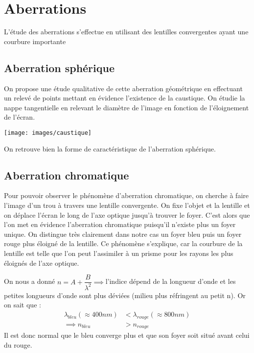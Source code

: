\documentclass[12pt,a4paper]{article}
\begin{document}
	\section{Aberrations}
	L'étude des aberrations s'effectue en utilisant des lentilles convergentes ayant une courbure importante
	\subsection{Aberration sphérique}
	On propose une étude qualitative de cette aberration géométrique en effectuant un relevé de points mettant en évidence l'existence de la caustique. On étudie la nappe tangentielle en relevant le diamètre de l'image en fonction de l'éloignement de l'écran.
	\begin{center}
		\texttt{[image: images/caustique]}
	\end{center}
	On retrouve bien la forme de caractéristique de l'aberration sphérique.
	\subsection{Aberration chromatique}
	Pour pouvoir observer le phénomène d'aberration chromatique, on cherche à faire l'image d'un trou à travers une lentille convergente. On fixe l'objet et la lentille et on déplace l'écran le long de l'axe optique jusqu'à trouver le foyer. C'est alors que l'on met en évidence l'aberration chromatique puisqu'il n'existe plus un foyer unique. On distingue très clairement dans notre cas un foyer bleu puis un foyer rouge plus éloigné de la lentille. Ce phénomène s'explique, car la courbure de la lentille est telle que l'on peut l'assimiler à un prisme pour les rayons les plus éloignés de l'axe optique.
	
	On nous a donné $n=A+\dfrac{B}{\lambda^2}\implies$l'indice dépend de la longueur d'onde et les petites longueurs d'onde sont plus déviées (milieu plus réfringent au petit n). Or on sait que :
	\begin{align*}
	\lambda_{bleu}(\approx400nm)&<\lambda_{rouge}(\approx800nm)\\
	\implies n_{bleu}&>n_{rouge}
	\end{align*}
	Il est donc normal que le bleu converge plus et que son foyer soit situé avant celui du rouge.
\end{document}
